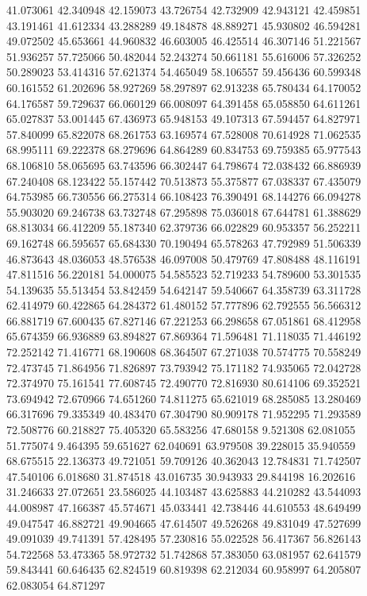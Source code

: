 41.073061
42.340948
42.159073
43.726754
42.732909
42.943121
42.459851
43.191461
41.612334
43.288289
49.184878
48.889271
45.930802
46.594281
49.072502
45.653661
44.960832
46.603005
46.425514
46.307146
51.221567
51.936257
57.725066
50.482044
52.243274
50.661181
55.616006
57.326252
50.289023
53.414316
57.621374
54.465049
58.106557
59.456436
60.599348
60.161552
61.202696
58.927269
58.297897
62.913238
65.780434
64.170052
64.176587
59.729637
66.060129
66.008097
64.391458
65.058850
64.611261
65.027837
53.001445
67.436973
65.948153
49.107313
67.594457
64.827971
57.840099
65.822078
68.261753
63.169574
67.528008
70.614928
71.062535
68.995111
69.222378
68.279696
64.864289
60.834753
69.759385
65.977543
68.106810
58.065695
63.743596
66.302447
64.798674
72.038432
66.886939
67.240408
68.123422
55.157442
70.513873
55.375877
67.038337
67.435079
64.753985
66.730556
66.275314
66.108423
76.390491
68.144276
66.094278
55.903020
69.246738
63.732748
67.295898
75.036018
67.644781
61.388629
68.813034
66.412209
55.187340
62.379736
66.022829
60.953357
56.252211
69.162748
66.595657
65.684330
70.190494
65.578263
47.792989
51.506339
46.873643
48.036053
48.576538
46.097008
50.479769
47.808488
48.116191
47.811516
56.220181
54.000075
54.585523
52.719233
54.789600
53.301535
54.139635
55.513454
53.842459
54.642147
59.540667
64.358739
63.311728
62.414979
60.422865
64.284372
61.480152
57.777896
62.792555
56.566312
66.881719
67.600435
67.827146
67.221253
66.298658
67.051861
68.412958
65.674359
66.936889
63.894827
67.869364
71.596481
71.118035
71.446192
72.252142
71.416771
68.190608
68.364507
67.271038
70.574775
70.558249
72.473745
71.864956
71.826897
73.793942
75.171182
74.935065
72.042728
72.374970
75.161541
77.608745
72.490770
72.816930
80.614106
69.352521
73.694942
72.670966
74.651260
74.811275
65.621019
68.285085
13.280469
66.317696
79.335349
40.483470
67.304790
80.909178
71.952295
71.293589
72.508776
60.218827
75.405320
65.583256
47.680158
9.521308
62.081055
51.775074
9.464395
59.651627
62.040691
63.979508
39.228015
35.940559
68.675515
22.136373
49.721051
59.709126
40.362043
12.784831
71.742507
47.540106
6.018680
31.874518
43.016735
30.943933
29.844198
16.202616
31.246633
27.072651
23.586025
44.103487
43.625883
44.210282
43.544093
44.008987
47.166387
45.574671
45.033441
42.738446
44.610553
48.649499
49.047547
46.882721
49.904665
47.614507
49.526268
49.831049
47.527699
49.091039
49.741391
57.428495
57.230816
55.022528
56.417367
56.826143
54.722568
53.473365
58.972732
51.742868
57.383050
63.081957
62.641579
59.843441
60.646435
62.824519
60.819398
62.212034
60.958997
64.205807
62.083054
64.871297
